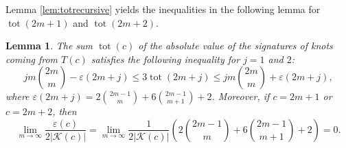 \documentclass[12pt]{amsart}
\newtheorem{lemma}[theorem]{Lemma}
\theoremstyle{definition}
\theoremstyle{remark}
\numberwithin{equation}{section}
\def\tot{\operatorname{tot}}
\begin{document}
Lemma \ref{lem:totrecursive} yields the inequalities in the following lemma for $\tot(2m+1)$ and $\tot(2m+2)$.%
\begin{lemma}
    \label{lem:totinequality}
    The sum $\tot(c)$ of the absolute value of the signatures of knots coming from $T(c)$ satisfies the following inequality for $j=1$ and $2$:
    \[ jm\binom{2m}{m} - \varepsilon(2m+j) \leq 3\tot(2m+j)\leq jm\binom{2m}{m}+\varepsilon(2m+j),\]
 where $\varepsilon(2m+j) = 2\binom{2m-1}{m}+6\binom{2m-1}{m+1}+2$. Moreover, if $c=2m+1$ or $c=2m+2$, then
        \[\lim_{m\to\infty} \frac{\varepsilon(c)}{2|\mathcal{K}(c)|}=\lim_{m\to\infty} \frac{1}{2|\mathcal{K}(c)|} \left(2\binom{2m-1}{m}+6\binom{2m-1}{m+1}+2 \right) = 0.\]
\end{lemma}
\end{document}

